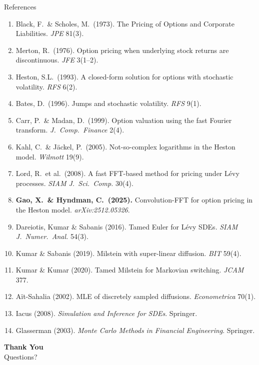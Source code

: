 \documentclass[10pt, aspectratio=169]{beamer}
\begin{document}
\begin{frame}[allowframebreaks]{References}
\footnotesize
\begin{enumerate}\setlength\itemsep{1pt}
  \item Black, F.\ \& Scholes, M.\ (1973). The Pricing of Options and Corporate Liabilities. \emph{JPE} 81(3).
  \item Merton, R.\ (1976). Option pricing when underlying stock returns are discontinuous. \emph{JFE} 3(1--2).
  \item Heston, S.L.\ (1993). A closed-form solution for options with stochastic volatility. \emph{RFS} 6(2).
  \item Bates, D.\ (1996). Jumps and stochastic volatility. \emph{RFS} 9(1).
  \item Carr, P.\ \& Madan, D.\ (1999). Option valuation using the fast Fourier transform. \emph{J.\ Comp.\ Finance} 2(4).
  \item Kahl, C.\ \& J\"ackel, P.\ (2005). Not-so-complex logarithms in the Heston model. \emph{Wilmott} 19(9).
  \item Lord, R.\ et al.\ (2008). A fast FFT-based method for pricing under L\'evy processes. \emph{SIAM J.\ Sci.\ Comp.} 30(4).
  \item \textbf{Gao, X.\ \& Hyndman, C.\ (2025).} Convolution-FFT for option pricing in the Heston model. \emph{arXiv:2512.05326}.
  \item Dareiotis, Kumar \& Sabanis (2016). Tamed Euler for L\'evy SDEs. \emph{SIAM J.\ Numer.\ Anal.} 54(3).
  \item Kumar \& Sabanis (2019). Milstein with super-linear diffusion. \emph{BIT} 59(4).
  \item Kumar \& Kumar (2020). Tamed Milstein for Markovian switching. \emph{JCAM} 377.
  \item A\"it-Sahalia (2002). MLE of discretely sampled diffusions. \emph{Econometrica} 70(1).
  \item Iacus (2008). \emph{Simulation and Inference for SDEs}. Springer.
  \item Glasserman (2003). \emph{Monte Carlo Methods in Financial Engineering}. Springer.
\end{enumerate}
\end{frame}

\begin{frame}
\centering
\vfill
{\Huge\bfseries Thank You}\\[12pt]
{\Large Questions?}
\vfill
\end{frame}
\end{document}

